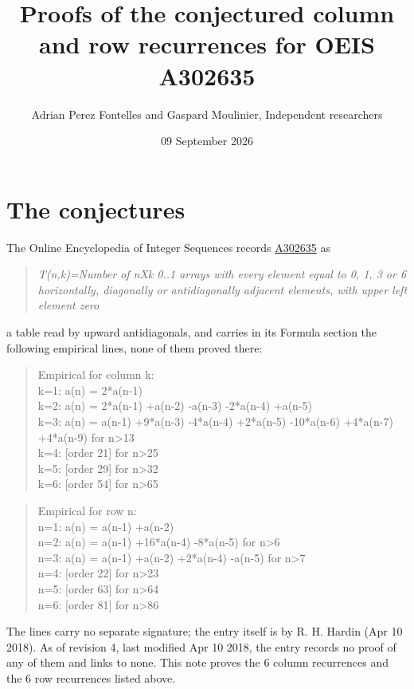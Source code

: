\documentclass[11pt]{article}
\title{Proofs of the conjectured column and row recurrences for OEIS A302635}
\author{Adrian Perez Fontelles and Gaspard Moulinier, Independent researchers}
\date{09 September 2026}
\theoremstyle{definition}
\begin{document}
\maketitle
\section{The conjectures}

The Online Encyclopedia of Integer Sequences records \href{https://oeis.org/A302635}{A302635} as

\begin{quote}\itshape T(n,k)=Number of nXk 0..1 arrays with every element equal to 0, 1, 3 or 6 horizontally, diagonally or antidiagonally adjacent elements, with upper left element zero\end{quote}

a table read by upward antidiagonals, and carries in its Formula section the following empirical lines, none of them proved there:

\begin{quote}\ttfamily Empirical for column k:\\
k=1: a(n) = 2*a(n-1)\\k=2: a(n) = 2*a(n-1) +a(n-2) -a(n-3) -2*a(n-4) +a(n-5)\\k=3: a(n) = a(n-1) +9*a(n-3) -4*a(n-4) +2*a(n-5) -10*a(n-6) +4*a(n-7) +4*a(n-9) for n>13\\k=4: [order 21] for n>25\\k=5: [order 29] for n>32\\k=6: [order 54] for n>65\end{quote}

\begin{quote}\ttfamily Empirical for row n:\\
n=1: a(n) = a(n-1) +a(n-2)\\n=2: a(n) = a(n-1) +16*a(n-4) -8*a(n-5) for n>6\\n=3: a(n) = a(n-1) +a(n-2) +2*a(n-4) -a(n-5) for n>7\\n=4: [order 22] for n>23\\n=5: [order 63] for n>64\\n=6: [order 81] for n>86\end{quote}

The lines carry no separate signature; the entry itself is by R. H. Hardin (Apr 10 2018). As of revision 4, last modified Apr 10 2018, the entry records no proof of any of them and links to none. This note proves the 6 column recurrences and the 6 row recurrences listed above.
\end{document}
